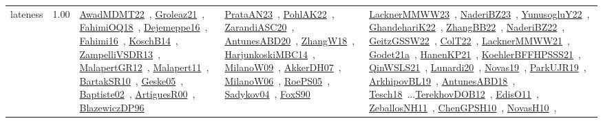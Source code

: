 {\begin{longtable}{p{3cm}r>{\raggedright\arraybackslash}p{6cm}>{\raggedright\arraybackslash}p{6cm}>{\raggedright\arraybackslash}p{8cm}}
\index{lateness}\index{Concepts!lateness}lateness &  1.00 & \href{../works/AwadMDMT22.pdf}{AwadMDMT22}~\cite{AwadMDMT22}, \href{../works/Groleaz21.pdf}{Groleaz21}~\cite{Groleaz21}, \href{../works/FahimiOQ18.pdf}{FahimiOQ18}~\cite{FahimiOQ18}, \href{../works/Dejemeppe16.pdf}{Dejemeppe16}~\cite{Dejemeppe16}, \href{../works/Fahimi16.pdf}{Fahimi16}~\cite{Fahimi16}, \href{../works/KoschB14.pdf}{KoschB14}~\cite{KoschB14}, \href{../works/ZampelliVSDR13.pdf}{ZampelliVSDR13}~\cite{ZampelliVSDR13}, \href{../works/MalapertGR12.pdf}{MalapertGR12}~\cite{MalapertGR12}, \href{../works/Malapert11.pdf}{Malapert11}~\cite{Malapert11}, \href{../works/BartakSR10.pdf}{BartakSR10}~\cite{BartakSR10}, \href{../works/Geske05.pdf}{Geske05}~\cite{Geske05}, \href{../works/Baptiste02.pdf}{Baptiste02}~\cite{Baptiste02}, \href{../works/ArtiguesR00.pdf}{ArtiguesR00}~\cite{ArtiguesR00}, \href{../works/BlazewiczDP96.pdf}{BlazewiczDP96}~\cite{BlazewiczDP96} & \href{../works/PrataAN23.pdf}{PrataAN23}~\cite{PrataAN23}, \href{../works/PohlAK22.pdf}{PohlAK22}~\cite{PohlAK22}, \href{../works/ZarandiASC20.pdf}{ZarandiASC20}~\cite{ZarandiASC20}, \href{../works/AntunesABD20.pdf}{AntunesABD20}~\cite{AntunesABD20}, \href{../works/ZhangW18.pdf}{ZhangW18}~\cite{ZhangW18}, \href{../works/HarjunkoskiMBC14.pdf}{HarjunkoskiMBC14}~\cite{HarjunkoskiMBC14}, \href{../works/MilanoW09.pdf}{MilanoW09}~\cite{MilanoW09}, \href{../works/AkkerDH07.pdf}{AkkerDH07}~\cite{AkkerDH07}, \href{../works/MilanoW06.pdf}{MilanoW06}~\cite{MilanoW06}, \href{../works/RoePS05.pdf}{RoePS05}~\cite{RoePS05}, \href{../works/Sadykov04.pdf}{Sadykov04}~\cite{Sadykov04}, \href{../works/FoxS90.pdf}{FoxS90}~\cite{FoxS90} & \href{../works/LacknerMMWW23.pdf}{LacknerMMWW23}~\cite{LacknerMMWW23}, \href{../works/NaderiBZ23.pdf}{NaderiBZ23}~\cite{NaderiBZ23}, \href{../works/YunusogluY22.pdf}{YunusogluY22}~\cite{YunusogluY22}, \href{../works/GhandehariK22.pdf}{GhandehariK22}~\cite{GhandehariK22}, \href{../works/ZhangBB22.pdf}{ZhangBB22}~\cite{ZhangBB22}, \href{../works/NaderiBZ22.pdf}{NaderiBZ22}~\cite{NaderiBZ22}, \href{../works/GeitzGSSW22.pdf}{GeitzGSSW22}~\cite{GeitzGSSW22}, \href{../works/ColT22.pdf}{ColT22}~\cite{ColT22}, \href{../works/LacknerMMWW21.pdf}{LacknerMMWW21}~\cite{LacknerMMWW21}, \href{../works/Godet21a.pdf}{Godet21a}~\cite{Godet21a}, \href{../works/HanenKP21.pdf}{HanenKP21}~\cite{HanenKP21}, \href{../works/KoehlerBFFHPSSS21.pdf}{KoehlerBFFHPSSS21}~\cite{KoehlerBFFHPSSS21}, \href{../works/QinWSLS21.pdf}{QinWSLS21}~\cite{QinWSLS21}, \href{../works/Lunardi20.pdf}{Lunardi20}~\cite{Lunardi20}, \href{../works/Novas19.pdf}{Novas19}~\cite{Novas19}, \href{../works/ParkUJR19.pdf}{ParkUJR19}~\cite{ParkUJR19}, \href{../works/ArkhipovBL19.pdf}{ArkhipovBL19}~\cite{ArkhipovBL19}, \href{../works/AntunesABD18.pdf}{AntunesABD18}~\cite{AntunesABD18}, \href{../works/Tesch18.pdf}{Tesch18}~\cite{Tesch18}...\href{../works/TerekhovDOB12.pdf}{TerekhovDOB12}~\cite{TerekhovDOB12}, \href{../works/EdisO11.pdf}{EdisO11}~\cite{EdisO11}, \href{../works/ZeballosNH11.pdf}{ZeballosNH11}~\cite{ZeballosNH11}, \href{../works/ChenGPSH10.pdf}{ChenGPSH10}~\cite{ChenGPSH10}, \href{../works/NovasH10.pdf}{NovasH10}~\cite{NovasH10}, 
\end{longtable}}
